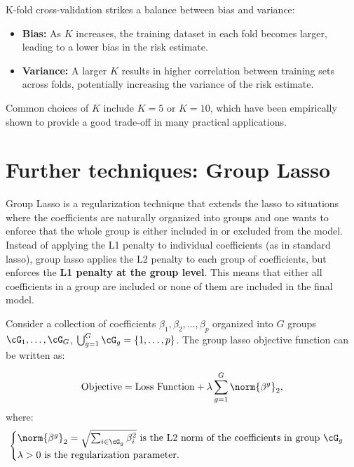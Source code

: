 K-fold cross-validation strikes a balance between bias and variance:
\begin{itemize}
\item \textbf{Bias:} As $K$ increases, the training dataset in each fold becomes larger,
leading to a lower bias in the risk estimate.
\item \textbf{Variance:} A larger $K$ results in higher correlation between training sets
across folds, potentially increasing the variance of the risk estimate.
\end{itemize}

Common choices of $K$ include $K = 5$ or $K = 10$, which have been empirically shown to provide a good trade-off in many practical applications.

\section{Further techniques: Group Lasso}

Group Lasso is a regularization technique that extends the lasso to situations
where the coefficients are naturally organized into groups and one wants
to enforce that the whole group is either included in or excluded from the
model. Instead of applying the L1 penalty to individual coefficients (as in
standard lasso), group lasso applies the L2 penalty to each group of coefficients, but enforces the \textbf{L1 penalty at the group level}. This means that
either all coefficients in a group are included or none of them are included in
the final model.

\begin{sloppypar}
Consider a collection of coefficients $\beta_1, \beta_2, \ldots, \beta_p$ organized into $G$ groups
$\cG_1, \ldots, \cG_G$, $\bigcup_{g=1}^G \cG_g = \{1, \ldots, p\}$. The group lasso objective function can be
written as:
\end{sloppypar}
\begin{equation}\label{eq:ch4-group-lasso}
\text{Objective} = \text{Loss Function} + \lambda \sum_{g=1}^G \norm{\beta^g}_2,
\end{equation}
where:
\begin{equation}\label{eq:ch4-group-lasso-norm}
\begin{cases}
\norm{\beta^g}_2 = \sqrt{\sum_{i \in \cG_g} \beta_i^2}\ \text{is the L2 norm of the coefficients in group } \cG_g \\
\lambda > 0\ \text{is the regularization parameter}.
\end{cases}
\end{equation}


